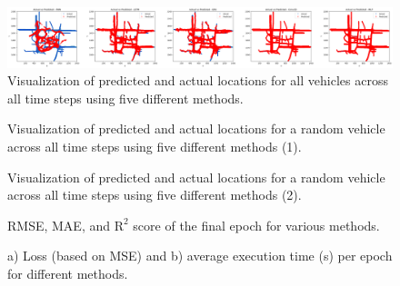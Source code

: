\documentclass[journal,onecolumn]{IEEEtran}
\begin{document}
{\begin{appendices}
\begin{figure}[H]
    \centering
    \includegraphics[width=1\textwidth]{figures/all_vehicles_comparison.png}
    \caption{Visualization of predicted and actual locations for all vehicles across all time steps using five different methods.}
    \label{fig:pred-vs-actual-all-vehicles}
\end{figure}

\begin{figure}[H]
    \centering
    
    \caption{Visualization of predicted and actual locations for a random vehicle across all time steps using five different methods (1).}
    \label{fig:pred-vs-actual-random-vehicle-1}
\end{figure}

\begin{figure}[H]
    \centering
    
    \caption{Visualization of predicted and actual locations for a random vehicle across all time steps using five different methods (2).}
    \label{fig:pred-vs-actual-random-vehicle-2}
\end{figure}

\begin{figure}[H]
    \centering
    
    \caption{RMSE, MAE, and $\text{R}^2$ score of the final epoch for various methods.}
    \label{fig:rmse-mae-r2-methods}
\end{figure}

\begin{figure}[H]
    \centering
    \begin{subfigure}[b]{0.45\linewidth}
        \centering
        
        \caption{}
        \label{fig:loss-over-epochs}
    \end{subfigure}%
    \begin{subfigure}[b]{0.6\linewidth}
        \centering
        
        \caption{}
        \label{fig:exec-time-over-epochs}
    \end{subfigure}
    \caption{a) Loss (based on MSE) and b) average execution time (s) per epoch for different methods.}
    \label{fig:methods-comparison}
\end{figure}
\clearpage


\end{appendices}}
\end{document}

